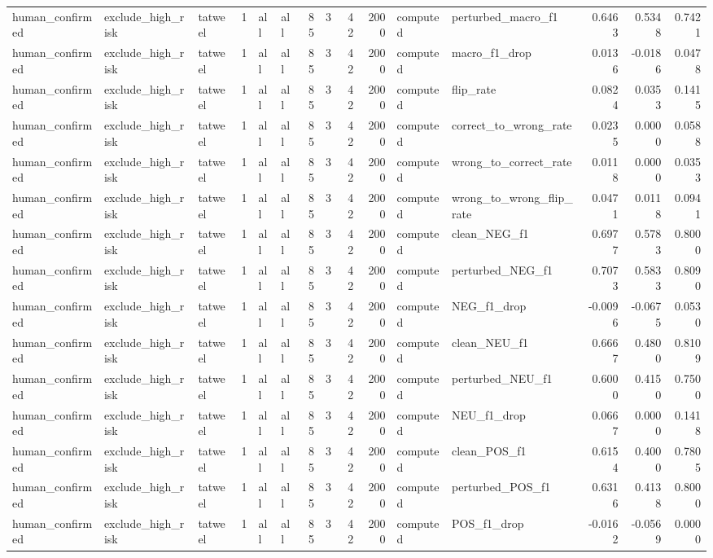 \begin{tabular}{lllrllrrrrllrrr}
human_confirmed & exclude_high_risk & tatweel & 1 & all & all & 85 & 3 & 42 & 2000 & computed & perturbed_macro_f1 & 0.6463 & 0.5348 & 0.7421 \\
human_confirmed & exclude_high_risk & tatweel & 1 & all & all & 85 & 3 & 42 & 2000 & computed & macro_f1_drop & 0.0136 & -0.0186 & 0.0478 \\
human_confirmed & exclude_high_risk & tatweel & 1 & all & all & 85 & 3 & 42 & 2000 & computed & flip_rate & 0.0824 & 0.0353 & 0.1415 \\
human_confirmed & exclude_high_risk & tatweel & 1 & all & all & 85 & 3 & 42 & 2000 & computed & correct_to_wrong_rate & 0.0235 & 0.0000 & 0.0588 \\
human_confirmed & exclude_high_risk & tatweel & 1 & all & all & 85 & 3 & 42 & 2000 & computed & wrong_to_correct_rate & 0.0118 & 0.0000 & 0.0353 \\
human_confirmed & exclude_high_risk & tatweel & 1 & all & all & 85 & 3 & 42 & 2000 & computed & wrong_to_wrong_flip_rate & 0.0471 & 0.0118 & 0.0941 \\
human_confirmed & exclude_high_risk & tatweel & 1 & all & all & 85 & 3 & 42 & 2000 & computed & clean_NEG_f1 & 0.6977 & 0.5783 & 0.8000 \\
human_confirmed & exclude_high_risk & tatweel & 1 & all & all & 85 & 3 & 42 & 2000 & computed & perturbed_NEG_f1 & 0.7073 & 0.5833 & 0.8090 \\
human_confirmed & exclude_high_risk & tatweel & 1 & all & all & 85 & 3 & 42 & 2000 & computed & NEG_f1_drop & -0.0096 & -0.0675 & 0.0530 \\
human_confirmed & exclude_high_risk & tatweel & 1 & all & all & 85 & 3 & 42 & 2000 & computed & clean_NEU_f1 & 0.6667 & 0.4800 & 0.8109 \\
human_confirmed & exclude_high_risk & tatweel & 1 & all & all & 85 & 3 & 42 & 2000 & computed & perturbed_NEU_f1 & 0.6000 & 0.4150 & 0.7500 \\
human_confirmed & exclude_high_risk & tatweel & 1 & all & all & 85 & 3 & 42 & 2000 & computed & NEU_f1_drop & 0.0667 & 0.0000 & 0.1418 \\
human_confirmed & exclude_high_risk & tatweel & 1 & all & all & 85 & 3 & 42 & 2000 & computed & clean_POS_f1 & 0.6154 & 0.4000 & 0.7805 \\
human_confirmed & exclude_high_risk & tatweel & 1 & all & all & 85 & 3 & 42 & 2000 & computed & perturbed_POS_f1 & 0.6316 & 0.4138 & 0.8000 \\
human_confirmed & exclude_high_risk & tatweel & 1 & all & all & 85 & 3 & 42 & 2000 & computed & POS_f1_drop & -0.0162 & -0.0569 & 0.0000 \\

\end{tabular}
